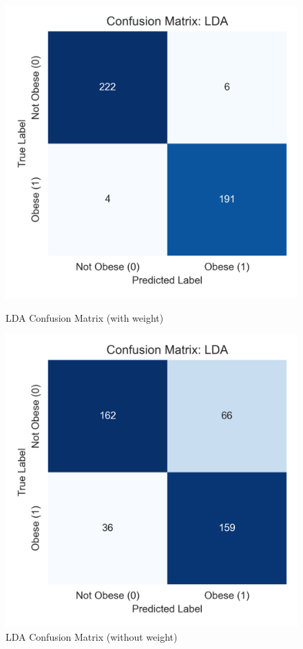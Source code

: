 \documentclass[a4paper,12pt]{article}
\begin{document}
\begin{figure}[H]
\centering
\begin{minipage}{0.35\textwidth}
    \centering
    \includegraphics[width=\linewidth]{lda_confusion.png}
    \caption{LDA Confusion Matrix (with weight)}
\end{minipage}
\hspace{0.04\textwidth}
\begin{minipage}{0.35\textwidth}
    \centering
    \includegraphics[width=\linewidth]{lda_confusion_withoutWeight.png}
    \caption{LDA Confusion Matrix (without weight)}
\end{minipage}
\label{fig:lda_weight_comparison}
\end{figure}
\end{document}
